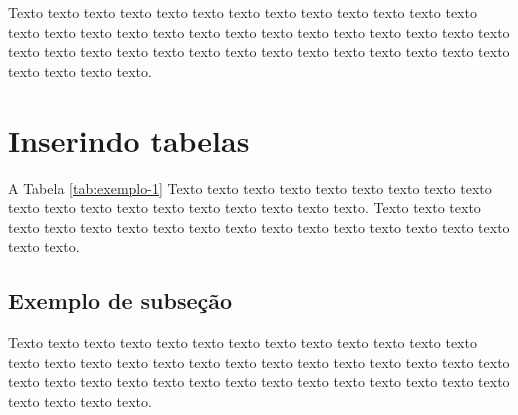     Texto texto texto texto texto texto texto texto texto texto texto texto texto texto texto texto texto texto texto texto texto texto texto texto texto texto texto texto texto texto texto texto texto texto texto texto texto texto texto texto texto texto texto texto texto.

    \section{Inserindo tabelas}
    \label{sec:tabelas}

	A Tabela \ref{tab:exemplo-1} Texto texto texto texto texto texto texto texto texto texto texto texto texto texto texto texto texto texto texto. Texto texto texto texto texto texto texto texto texto texto texto texto texto texto texto texto texto texto texto.
		
	\begin{table}[h!]	
		\centering
	\end{table}

\subsection{Exemplo de subseção} \label{sec:ex_sec}
	
Texto texto texto texto texto texto texto texto texto texto texto texto texto texto texto texto texto texto texto texto texto texto texto texto texto texto texto texto texto texto texto texto texto texto texto texto texto texto texto texto texto texto texto texto texto.



